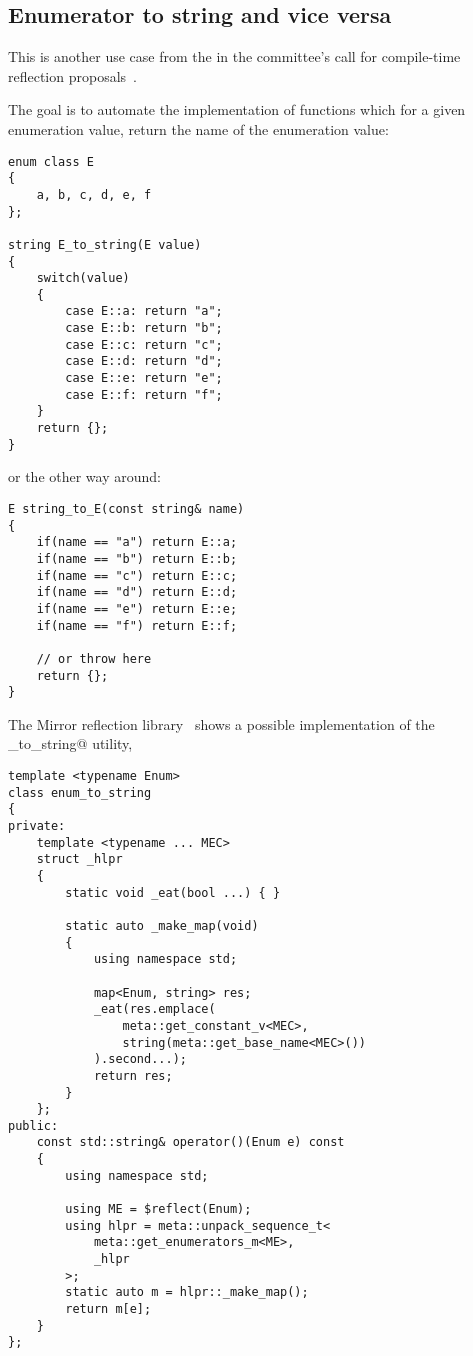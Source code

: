 \subsection{Enumerator to string and vice versa}
\label{use-case-enum-to-string}

This is another use case from the  in the committee's
call for compile-time reflection proposals~\cite{ISOCPP-N3814}. 

The goal is to automate the implementation of functions which for a given
enumeration value, return the name of the enumeration value:

\begin{verbatim}
enum class E
{
	a, b, c, d, e, f
};

string E_to_string(E value)
{
	switch(value)
	{
		case E::a: return "a";
		case E::b: return "b";
		case E::c: return "c";
		case E::d: return "d";
		case E::e: return "e";
		case E::f: return "f";
	}
	return {};
}
\end{verbatim}

or the other way around:

\begin{verbatim}
E string_to_E(const string& name)
{
	if(name == "a") return E::a;
	if(name == "b") return E::b;
	if(name == "c") return E::c;
	if(name == "d") return E::d;
	if(name == "e") return E::e;
	if(name == "f") return E::f;

	// or throw here
	return {};
}
\end{verbatim}

The Mirror reflection library~\cite{Chochlik-Mirror-new-doc} shows a possible
implementation of the \verb@enum_to_string@ utility,

\begin{verbatim}
template <typename Enum>
class enum_to_string
{
private:
	template <typename ... MEC>
	struct _hlpr
	{
		static void _eat(bool ...) { }

		static auto _make_map(void)
		{
			using namespace std;

			map<Enum, string> res;
			_eat(res.emplace(
				meta::get_constant_v<MEC>,
				string(meta::get_base_name<MEC>())
			).second...);
			return res;
		}
	};
public:
	const std::string& operator()(Enum e) const
	{
		using namespace std;

		using ME = $reflect(Enum);
		using hlpr = meta::unpack_sequence_t<
			meta::get_enumerators_m<ME>,
			_hlpr
		>;
		static auto m = hlpr::_make_map();
		return m[e];
	}
};
\end{verbatim}

